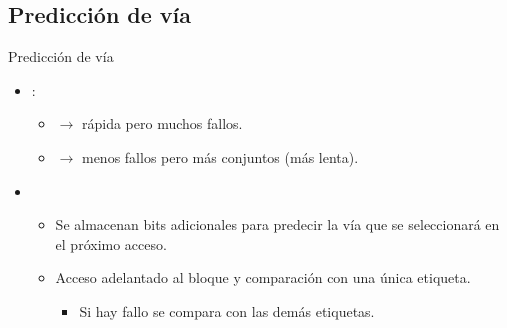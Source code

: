 \subsection{Predicción de vía}

\begin{frame}[t]{Predicción de vía}
\begin{itemize}
  \item {}:
    \begin{itemize}
      \item {} $\rightarrow$ rápida pero muchos fallos.
      \item {} $\rightarrow$ menos fallos pero más conjuntos (más lenta).
    \end{itemize}

  \item {}
    \begin{itemize}
      \item Se almacenan bits adicionales para predecir la vía que se seleccionará en el próximo acceso.
      \item Acceso adelantado al bloque y comparación con una única etiqueta.
        \begin{itemize}
          \item Si hay fallo se compara con las demás etiquetas.
        \end{itemize}
    \end{itemize}
\end{itemize}
\end{frame}

